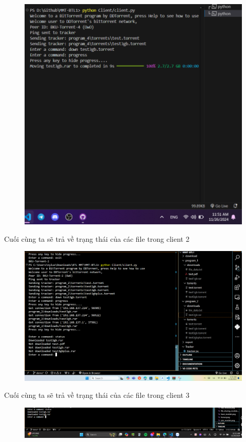 \documentclass[a4paper]{article}
\begin{document}
\begin{figure}[H]
    \centering
    \includegraphics[width=1\textwidth]{images/21.png}
    \captionsetup{labelformat=empty}
\end{figure}
Cuối cùng ta sẽ trả về trạng thái của các file trong client 2
\begin{figure}[H]
    \centering
    \includegraphics[width=1\textwidth]{images/22.png}
    \captionsetup{labelformat=empty}
\end{figure}
Cuối cùng ta sẽ trả về trạng thái của các file trong client 3
\begin{figure}[H]
    \centering
    \includegraphics[width=1\textwidth]{images/32.png}
    \captionsetup{labelformat=empty}
\end{figure}
\end{document}
